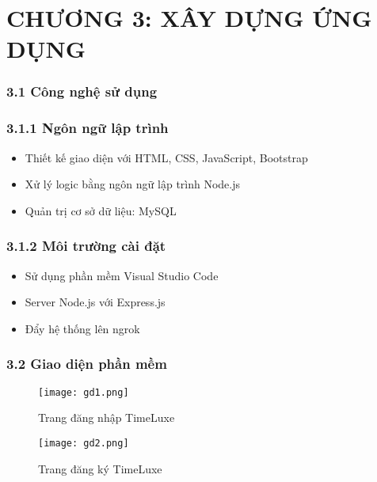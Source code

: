 \chapter*{CHƯƠNG 3: XÂY DỰNG ỨNG DỤNG }

\subsection*{\textbf{3.1 Công nghệ sử dụng}}

\subsection*{\textbf{3.1.1 Ngôn ngữ lập trình}}
\begin{itemize}
    \item Thiết kế giao diện với HTML, CSS, JavaScript, Bootstrap
    \item Xử lý logic bằng ngôn ngữ lập trình Node.js
    \item Quản trị cơ sở dữ liệu: MySQL
\end{itemize}

\subsection*{\textbf{3.1.2 Môi trường cài đặt}}    
\begin{itemize}
    \item Sử dụng phần mềm Visual Studio Code
    \item Server Node.js với Express.js
    \item Đẩy hệ thống lên ngrok
\end{itemize}

\subsection*{\textbf{3.2 Giao diện phần mềm}}

\begin{figure}[H]
  \centering
  \texttt{[image: gd1.png]}
  \caption{Trang đăng nhập TimeLuxe}
  \label{fig:login}
\end{figure}

\begin{figure}[H]
  \centering
  \texttt{[image: gd2.png]}
  \caption{Trang đăng ký TimeLuxe}
  \label{fig:register}
\end{figure}

